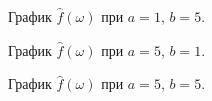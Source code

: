 \documentclass[a5paper, 10pt]{article}
\theoremstyle{definition}
\theoremstyle{plain}
\theoremstyle{remark}
\begin{document}
\begin{figure}[h!]
\caption{График $\hat{f}(\omega)$ при $a = 1$, $b = 5$.}
\caption{График $\hat{f}(\omega)$ при $a = 5$, $b = 1$.}
\end{figure}


\begin{figure}[h!]
\caption{График $\hat{f}(\omega)$ при $a = 5$, $b = 5$.}
\end{figure}
\end{document}
